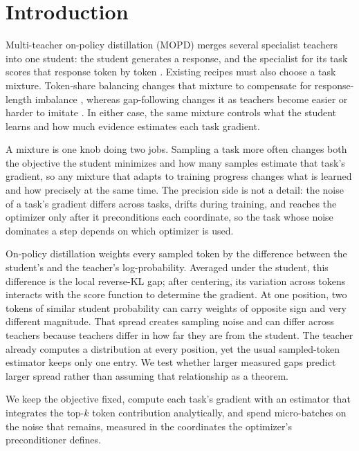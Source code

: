 \section{Introduction}
\label{sec:intro}

Multi-teacher on-policy distillation (MOPD) merges several specialist teachers
into one student: the student generates a response, and the specialist for its
task scores that response token by token
\citep{ma2026mopdmultiteacheronpolicydistillation}. Existing recipes must also
choose a task mixture. Token-share balancing changes that mixture to compensate
for response-length imbalance \citep{gao2026openmopddiagnosingfixingcapability},
whereas gap-following changes it as teachers become easier or harder to imitate
\citep{sun2026d3mopd}. In either case, the same mixture controls what the
student learns and how much evidence estimates each task gradient.

A mixture is one knob doing two jobs. Sampling a task more often changes both
the objective the student minimizes and how many samples estimate that task's
gradient, so any mixture that adapts to training progress changes what is
learned and how precisely at the same time. The precision side is not a detail:
the noise of a task's gradient differs across tasks, drifts during training,
and reaches the optimizer only after it preconditions each coordinate, so the
task whose noise dominates a step depends on which optimizer is used.

On-policy distillation weights every sampled token by the difference between
the student's and the teacher's log-probability. Averaged under the student,
this difference is the local reverse-KL gap; after centering, its variation
across tokens interacts with the score function to determine the gradient.
At one position, two tokens of similar student probability can carry weights
of opposite sign and very different magnitude. That spread creates sampling
noise and can differ across teachers because teachers differ in how far they
are from the student. The teacher already computes a distribution at every
position, yet the usual sampled-token estimator keeps only one entry. We test
whether larger measured gaps predict larger spread rather than assuming that
relationship as a theorem.

We keep the objective fixed, compute each task's gradient with an estimator
that integrates the top-$k$ token contribution analytically, and spend
micro-batches on the noise that remains, measured in the coordinates the
optimizer's preconditioner defines.

